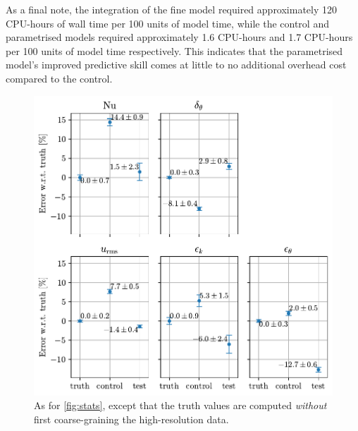 \documentclass[../main.tex]{subfiles}
\begin{document}
As a final note, the integration of the fine model required approximately
120 CPU-hours of wall time per 100 units of model time, while the control and
parametrised models required approximately 1.6 CPU-hours and 1.7 CPU-hours
per 100 units of model time respectively. This indicates that the parametrised
model's improved predictive skill comes at little to no additional overhead
cost compared to the control.

\begin{figure}[ht]
    \centering
    \includegraphics[width=0.6\linewidth]{figures/stats_vs_fine.pdf}
    \caption{
        As for \cref{fig:stats}, except that the truth values are computed
        \emph{without} first coarse-graining the high-resolution data.
    }
    \label{fig:stats_vs_fine}
\end{figure}

\ifSubfilesClassLoaded{%
    \emergencystretch=5em
    \printbibliography{}
}{}
\end{document}
